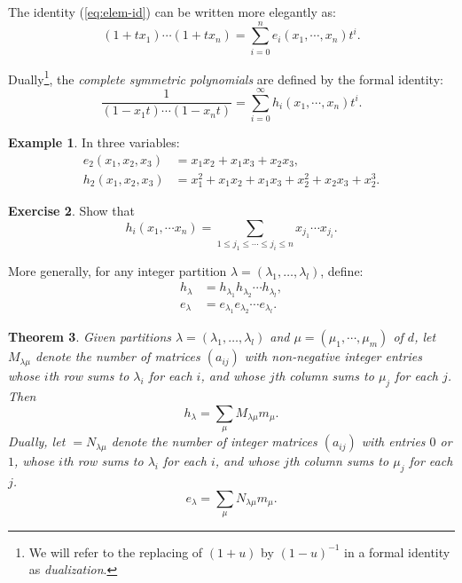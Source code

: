 \documentclass[11pt]{amsart}
\newtheorem{theorem}{Theorem}[subsection]
\theoremstyle{definition}
\theoremstyle{example}
\newtheorem{example}[theorem]{Example}
\newtheorem{exercise}[theorem]{Exercise}
\begin{document}
The identity (\ref{eq:elem-id}) can be written more elegantly as:
\begin{displaymath}
  (1+t x_1) \dotsb (1+tx_n) = \sum_{i=0}^n e_i(x_1,\dotsb, x_n)t^i.
\end{displaymath}

Dually\footnote{We will refer to the replacing of $(1+u)$ by $(1-u)^{-1}$ in a formal identity as \emph{dualization}.}, the \emph{complete symmetric polynomials} are defined by the formal identity:
\begin{displaymath}
  \frac 1{(1-x_1t)\dotsb (1-x_nt)} = \sum_{i=0}^\infty h_i(x_1,\dotsb, x_n)t^i.
\end{displaymath}
\begin{example}
  In three variables:
  \begin{align*}
    e_2(x_1,x_2,x_3) & = x_1x_2 + x_1x_3 + x_2x_3,\\
    h_2(x_1,x_2,x_3) & = x_1^2 + x_1x_2 + x_1x_3 + x_2^2 + x_2x_3 + x_2^3.
  \end{align*}
\end{example}
\begin{exercise}
  Show that
  \begin{displaymath}
    h_i(x_1,\dotsb x_n) = \sum_{1\leq j_1\leq \dotsb \leq j_i\leq n} x_{j_1}\dotsb x_{j_i}.
  \end{displaymath}
\end{exercise}
More generally, for any integer partition $\lambda=(\lambda_1,\dotsc, \lambda_l)$, define:
\begin{align*}
  h_\lambda &= h_{\lambda_1} h_{\lambda_2}\dotsb h_{\lambda_l},\\
  e_\lambda &= e_{\lambda_1} e_{\lambda_2}\dotsb e_{\lambda_l}.
\end{align*}
\begin{theorem}
  Given partitions $\lambda=(\lambda_1,\dotsc,\lambda_l)$ and $\mu=(\mu_1,\dotsb, \mu_m)$ of $d$, let $M_{\lambda\mu}$ denote the number of matrices $(a_{ij})$ with non-negative integer entries whose $i$th row sums to $\lambda_i$ for each $i$, and whose $j$th column sums to $\mu_j$ for each $j$.
  Then
  \begin{displaymath}
    h_\lambda = \sum_\mu M_{\lambda\mu} m_\mu.
  \end{displaymath}
  Dually, let $=N_{\lambda\mu}$ denote the number of integer matrices $(a_{ij})$ with entries $0$ or $1$, whose $i$th row sums to $\lambda_i$ for each $i$, and whose $j$th column sums to $\mu_j$ for each $j$.
  \begin{displaymath}
    e_\lambda = \sum_\mu N_{\lambda\mu} m_\mu.
  \end{displaymath}
\end{theorem}
\end{document}
